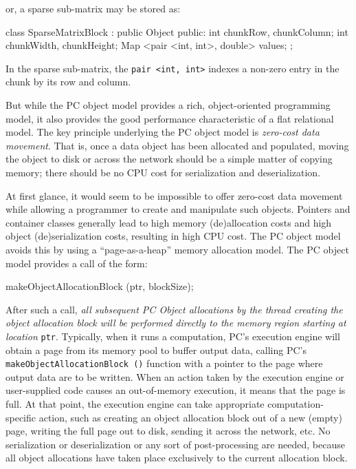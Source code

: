 or, a sparse sub-matrix may be stored as:

\begin{codesmall}
class SparseMatrixBlock : public Object {
public:
	int chunkRow, chunkColumn;
	int chunkWidth, chunkHeight;
	Map <pair <int, int>, double> values; 
};
\end{codesmall}

In the sparse sub-matrix, the \texttt{pair <int, int>} indexes a non-zero entry in the chunk by its row and column.

But while the PC object model provides a rich, object-oriented programming model, it also provides the good performance characteristic
of a flat relational model.
The key principle underlying the PC object model is \emph{zero-cost data movement}.  That is, once a data object
has been allocated and populated, moving the object to disk or across
the network should be a simple matter of copying memory; there
should be no CPU cost for serialization and deserialization.

At first glance, it would seem to be impossible to offer zero-cost data movement while allowing a programmer to create and manipulate such objects.  
Pointers and container classes 
generally lead to high memory (de)allocation costs and high object (de)serialization costs, resulting in high CPU cost.
The PC object model avoids this 
by using a ``page-as-a-heap'' memory allocation model.  
The PC object model provides a call of the form:

\begin{codesmall}
makeObjectAllocationBlock (ptr, blockSize);
\end{codesmall}

After such a call, \emph{all subsequent PC Object allocations by the thread creating the object allocation block will be performed directly to the memory
region starting at location} \texttt{ptr}.
Typically, when it runs a computation, PC's execution engine will obtain a page from its memory pool to buffer output data, calling
PC's
\texttt{makeObjectAllocationBlock ()} function with a pointer to the page where output data are to be written.  
When an action taken by the execution engine or user-supplied code causes an
out-of-memory execution, it means that the page is full.  At that point, the execution engine can take appropriate computation-specific 
action, such as creating 
an object allocation block out of a new (empty) page, writing the full page out to disk, sending it across the network, etc.  
No serialization or deserialization or any sort of post-processing are needed, 
because all object allocations have taken place exclusively to the current allocation block.  

